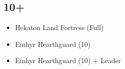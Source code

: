 \documentclass{HordeModeTarot}
\begin{document}
\begin{multicols}{2}
\subsection*{10+}

\begin{itemize}[leftmargin=*]
\item[] Hekaton Land Fortress (Full)
\item[] Einhyr Hearthguard (10)
\item[] Einhyr Hearthguard (10) + Leader
\end{itemize}


\end{multicols}
\end{document}
